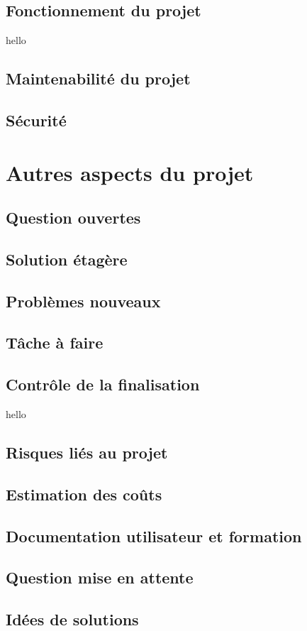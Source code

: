 		\subsection{Fonctionnement du projet}
			hello
		\subsection{Maintenabilité du projet}
		
		\subsection{Sécurité}
		
	\section{Autres aspects du projet}
		\subsection{Question ouvertes}
		
		\subsection{Solution étagère}
		
		\subsection{Problèmes nouveaux}
		
		\subsection{Tâche à faire}
		
		\subsection{Contrôle de la finalisation}
			hello
		\subsection{Risques liés au projet}
		
		\subsection{Estimation des coûts}
		
		\subsection{Documentation utilisateur et formation}
		
		\subsection{Question mise en attente}
		
		\subsection{Idées de solutions}
		

